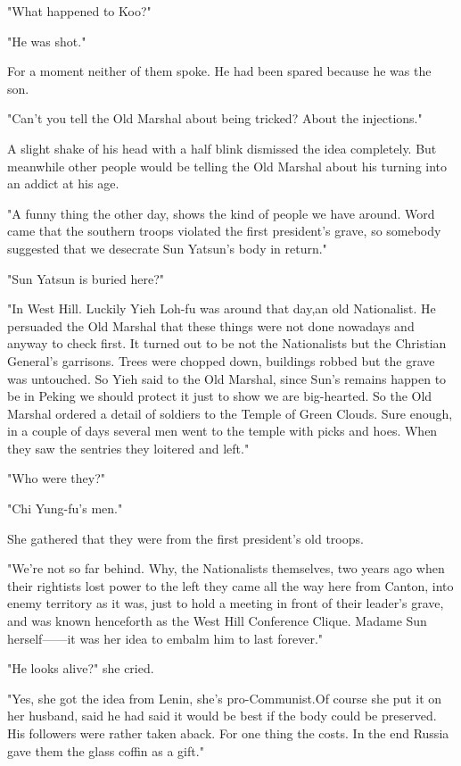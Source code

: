 \par "What happened to Koo?"
\par "He was shot."
\par For a moment neither of them spoke. He had been spared because he was the son.
\par "Can't you tell the Old Marshal about being tricked? About the injections."
\par A slight shake of his head with a half blink dismissed the idea completely. But meanwhile other people would be telling the Old Marshal about his turning into an addict at his age.
\par "A funny thing the other day, shows the kind of people we have around. Word came that the southern troops violated the first president's grave, so somebody suggested that we desecrate Sun Yatsun's body in return."
\par "Sun Yatsun is buried here?"
\par "In West Hill. Luckily Yieh Loh-fu was around that day,an old Nationalist. He persuaded the Old Marshal that these things were not done nowadays and anyway to check first. It turned out to be not the Nationalists but the Christian General's garrisons. Trees were chopped down, buildings robbed but the grave was untouched. So Yieh said to the Old Marshal, since Sun's remains happen to be in Peking we should protect it just to show we are big-hearted. So the Old Marshal ordered a detail of soldiers to the Temple of Green Clouds. Sure enough, in a couple of days several men went to the temple with picks and hoes. When they saw the sentries they loitered and left."
\par "Who were they?"
\par "Chi Yung-fu's men."
\par She gathered that they were from the first president's old troops.
\par "We're not so far behind. Why, the Nationalists themselves, two years ago when their rightists lost power to the left they came all the way here from Canton, into enemy territory as it was, just to hold a meeting in front of their leader's grave, and was known henceforth as the West Hill Conference Clique. Madame Sun herself——it was her idea to embalm him to last forever."
\par "He looks alive?" she cried.
\par "Yes, she got the idea from Lenin, she's pro-Communist.Of course she put it on her husband, said he had said it would be best if the body could be preserved. His followers were rather taken aback. For one thing the costs. In the end Russia gave them the glass coffin as a gift."
